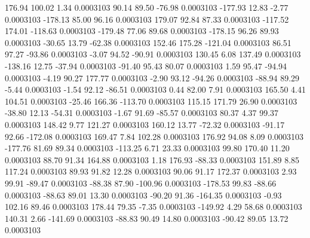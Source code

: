       176.94      100.02        1.34     0.0003103
       90.14       89.50      -76.98     0.0003103
     -177.93       12.83       -2.77     0.0003103
     -178.13       85.00       96.16     0.0003103
      179.07       92.84       87.33     0.0003103
     -117.52      174.01     -118.63     0.0003103
     -179.48       77.06       89.68     0.0003103
     -178.15       96.26       89.93     0.0003103
      -30.65       13.79      -62.38     0.0003103
      152.46      175.28     -121.04     0.0003103
       86.51       97.27      -93.86     0.0003103
       -3.07       94.52      -90.91     0.0003103
      130.45        6.08      137.49     0.0003103
     -138.16       12.75      -37.94     0.0003103
      -91.40       95.43       80.07     0.0003103
        1.59       95.47      -94.94     0.0003103
       -4.19       90.27      177.77     0.0003103
       -2.90       93.12      -94.26     0.0003103
      -88.94       89.29       -5.44     0.0003103
       -1.54       92.12      -86.51     0.0003103
        0.44       82.00        7.91     0.0003103
      165.50        4.41      104.51     0.0003103
      -25.46      166.36     -113.70     0.0003103
      115.15      171.79       26.90     0.0003103
      -38.80       12.13      -54.31     0.0003103
       -1.67       91.69      -85.57     0.0003103
       80.37        4.37       99.37     0.0003103
      148.42        9.77      121.27     0.0003103
      160.12       13.77      -72.32     0.0003103
      -91.17       92.66     -172.08     0.0003103
      169.47        7.84      102.28     0.0003103
      176.92       94.08        8.09     0.0003103
     -177.76       81.69       89.34     0.0003103
     -113.25        6.71       23.33     0.0003103
       99.80      170.40       11.20     0.0003103
       88.70       91.34      164.88     0.0003103
        1.18      176.93      -88.33     0.0003103
      151.89        8.85      117.24     0.0003103
       89.93       91.82       12.28     0.0003103
       90.06       91.17      172.37     0.0003103
        2.93       99.91      -89.47     0.0003103
      -88.38       87.90     -100.96     0.0003103
     -178.53       99.83      -88.66     0.0003103
      -88.63       89.01       13.30     0.0003103
      -90.20       91.36     -164.35     0.0003103
       -0.93      102.16       89.46     0.0003103
      178.44       79.35       -7.35     0.0003103
     -149.92        4.29       58.68     0.0003103
      140.31        2.66     -141.69     0.0003103
      -88.83       90.49       14.80     0.0003103
      -90.42       89.05       13.72     0.0003103
